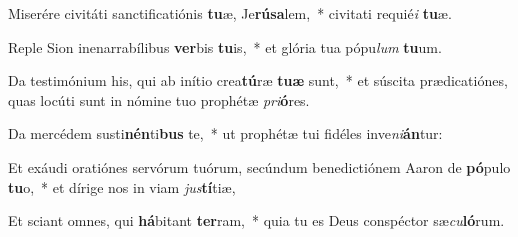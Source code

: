 \item Miserére civitáti sanctificatiónis \textbf{tu}æ, Je\textbf{rú}\textbf{sa}lem,~* civitati requié\textit{i} \textbf{tu}æ.
\item Reple Sion inenarrabílibus \textbf{ver}bis \textbf{tu}is,~* et glória tua pópu\textit{lum} \textbf{tu}um.
\item Da testimónium his, qui ab inítio crea\textbf{tú}ræ \textbf{tu}\textbf{æ} sunt,~* et súscita prædicatiónes, quas locúti sunt in nómine tuo prophétæ \textit{pri}\textbf{ó}res.
\item Da mercédem susti\textbf{nén}ti\textbf{bus} te,~* ut prophétæ tui fidéles inve\textit{ni}\textbf{án}tur:
\item Et exáudi oratiónes servórum tuórum, secúndum benedictiónem Aaron de \textbf{pó}pulo \textbf{tu}o,~* et dírige nos in viam \textit{jus}\textbf{tí}tiæ,
\item Et sciant omnes, qui \textbf{há}bitant \textbf{ter}ram,~* quia tu es Deus conspéctor sæ\textit{cu}\textbf{ló}rum.
